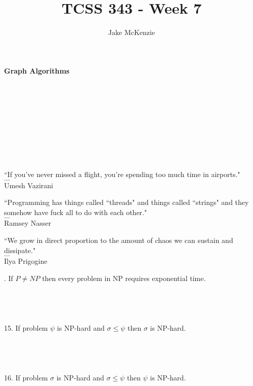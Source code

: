 \documentclass[12pt]{article}
\begin{document}
\title{TCSS 343 - Week 7}
\author{Jake McKenzie}
\maketitle
\noindent\centerline{\textbf{Graph Algorithms}}\\\\\\\\\\\\\\\\
\begin{center}
    ``If you’ve never missed a flight, you’re spending too much time in airports." \\$\dots$\\ Umesh Vazirani
\end{center}
\begin{center}
    ``Programming has things called ``threads" and things called ``strings" and they somehow have fuck all to do with each other." \\$\dots$\\ Ramsey Nasser
\end{center}
\begin{center}
    ``We grow in direct proportion to the amount of chaos we can sustain and dissipate." \\$\dots$\\ Ilya Prigogine
\end{center}
. If $P \ne NP$ then every problem in NP requires exponential time.\\\\\\\\\\
15. If problem $\psi$ is NP-hard and $\sigma \le \psi$ then $\sigma$ is NP-hard.\\\\\\\\\\
16. If problem $\sigma$ is NP-hard and $\sigma \le \psi$ then $\psi$ is NP-hard.
\end{document}
